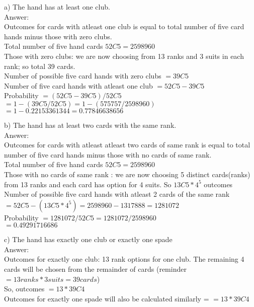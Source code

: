 \documentclass[14pt]{extreport}
\begin{document}
\begin{enumerate}[label=(\alph*)]
a) The hand has at least one club.\\

Answer:\\
Outcomes for cards with atleast one club is equal to total number of five card hands minus those with zero clubs. \\

Total number of five hand cards $ 52C5 = 2598960$\\
Those with zero clubs: we are now choosing from 13 ranks and 3 suits in each rank; so total 39 cards. \\
Number of possible five card hands with zero clubs $ = 39C5 $ \\
Number of five card hands with atleast one club $ = 52C5 - 39C5$ \\

Probability $= \left(52C5 - 39C5\right) / 52C5$ \\
    $ = 1 - \left(39C5 / 52C5\right) = 1 - \left( 575757/ 2598960\right)$ \\
    $ = 1 - 0.22153361344 = 0.77846638656$
    \newline
    
b) The hand has at least two cards with the same rank.\\

Answer:\\
Outcomes for cards with atleast atleast two cards of same rank is equal to total number of five card hands minus those with no cards of same rank. \\

Total number of five hand cards $ 52C5 = 2598960$\\
Those with no cards of same rank : we are now choosing 5 distinct cards(ranks) from 13 ranks and each card has option for 4 suits. So $ 13C5 * 4^{5} $ outcomes \\
Number of possible five card hands with atleast 2 cards of the same rank $ = 52C5 - (13C5 * 4^{5}) = 2598960 - 1317888 = 1281072 $\\

Probability $ = 1281072 / 52C5 = 1281072 / 2598960 $ \\
 $ = 0.49291716686$
\newline
\newpage

c) The hand has exactly one club or exactly one spade\\

Answer:\\

Outcomes for exactly one club: 13 rank options for one club. The remaining 4 cards will be chosen from the remainder of cards (reminder $= 13 ranks * 3 suits = 39 cards$) \\
So, outcomes $ = 13 * 39C4 $ \\
Outcomes for exactly one spade will also be calculated similarly = $ = 13 * 39C4 $ \\


\end{enumerate}
\end{document}
